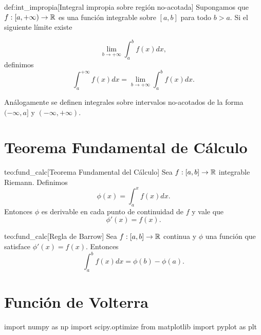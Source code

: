 \begin{definicion}{def:int_impropia}[Integral impropia sobre región no-acotada] Supongamos  que $f:[a,+\infty)\to\mathbb{R}$ es una función integrable sobre $[a,b]$  para todo $b>a$. Si el siguiente límite existe

\[
 \lim_{b\to +\infty}\int_a^bf(x)dx,
\]
definimos 
\begin{equation}\label{eq:int_impro_inf}
 \int_a^{+\infty}f(x)dx= \lim_{b\to +\infty}\int_a^bf(x)dx.
\end{equation}

\end{definicion}

Análogamente se definen integrales sobre intervalos no-acotados de la forma $(-\infty, a]$ y $(-\infty,+\infty)$.



\section{Teorema Fundamental de Cálculo}


\begin{teorema}{teo:fund_calc}[Teorema Fundamental del Cálculo]
 Sea $f:[a,b]\to\mathbb{R}$ integrable Riemann. Definimos
 \begin{equation*}\label{eq:primi1}
  \phi(x)=\int_a^{x}f(x)dx.
 \end{equation*}
Entonces $\phi$ es derivable en cada punto de continuidad de $f$ y vale que
 \begin{equation}\label{eq:primi2}
  \phi'(x)=f(x).
 \end{equation}
\end{teorema}


\begin{corolario}{teo:fund_calc}[Regla de Barrow]
 Sea $f:[a,b]\to\mathbb{R}$ continua y $\phi$ una función que satisface $\phi'(x)=f(x)$. Entonces
 \begin{equation}\label{eq:barrow}
  \int_a^{b}f(x)dx=\phi(b)-\phi(a).
 \end{equation}
\end{corolario}


\section{Función de Volterra}

\begin{pyblock}
import numpy as np
import scipy.optimize
from matplotlib import pyplot as plt
\end{pyblock}

